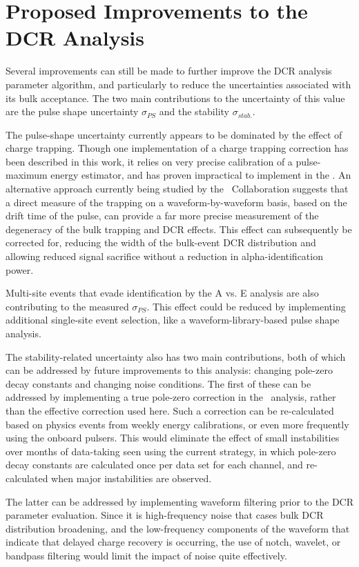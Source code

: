 \section{Proposed Improvements to the DCR Analysis}
Several improvements can still be made to further improve the DCR analysis parameter algorithm, and particularly to reduce the uncertainties associated with its bulk acceptance. The two main contributions to the uncertainty of this value are the pulse shape uncertainty $\sigma_{PS}$ and the stability $\sigma_{stab.}$. 

The pulse-shape uncertainty currently appears to be dominated by the effect of charge trapping. Though one implementation of a charge trapping correction has been described in this work, it relies on very precise calibration of a pulse-maximum energy estimator, and has proven impractical to implement in the \DEM. An alternative approach currently being studied by the \MJ\ Collaboration suggests that a direct measure of the trapping on a waveform-by-waveform basis, based on the drift time of the pulse, can provide a far more precise measurement of the degeneracy of the bulk trapping and DCR effects. This effect can subsequently be corrected for, reducing the width of the bulk-event DCR distribution and allowing reduced signal sacrifice without a reduction in alpha-identification power. 

Multi-site events that evade identification by the A vs. E analysis are also contributing to the measured $\sigma_{PS}$. This effect could be reduced by implementing additional single-site event selection, like a waveform-library-based pulse shape analysis.

The stability-related uncertainty also has two main contributions, both of which can be addressed by future improvements to this analysis: changing pole-zero decay constants and changing noise conditions. The first of these can be addressed by implementing a true pole-zero correction in the \MJ\ analysis, rather than the effective correction used here. Such a correction can be re-calculated based on physics events from weekly energy calibrations, or even more frequently using the onboard pulsers. This would eliminate the effect of small instabilities over months of data-taking seen using the current strategy, in which pole-zero decay constants are calculated once per data set for each channel, and re-calculated when major instabilities are observed. 

The latter can be addressed by implementing waveform filtering prior to the DCR parameter evaluation. Since it is high-frequency noise that cases bulk DCR distribution broadening, and the low-frequency components of the waveform that indicate that delayed charge recovery is occurring, the use of notch, wavelet, or bandpass filtering would  limit the impact of noise quite effectively. 

